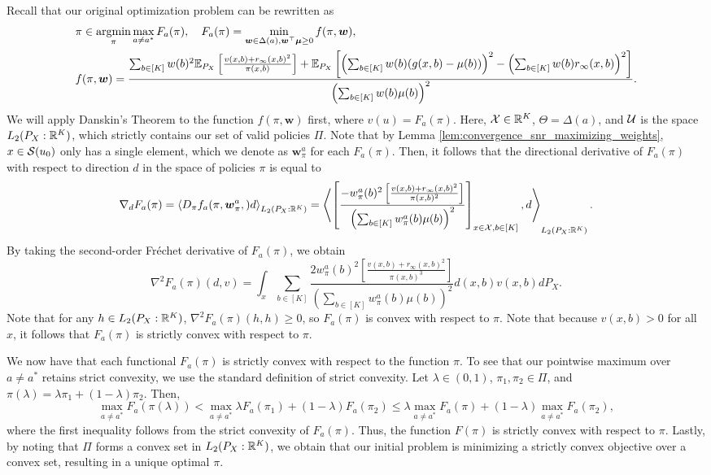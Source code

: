 \documentclass{article}
\begin{document}
\begin{appendices}
Recall that our original optimization problem can be rewritten as 
\begin{align}
    &\pi \in \argmin_{\pi} \max_{a \neq a^*} F_a(\pi), \quad F_a(\pi) = \min_{\bm{w} \in \Delta(a), \bm{w}^\top \bm{\mu} \geq 0} f(\pi, \bm{w}), \\
    &f(\pi, \bm{w}) = \frac{\sum_{b \in [K]} w(b)^2\EE_{P_X}\left[\frac{v(x,b) + r_\infty(x,b)^2}{\pi(x,b)}\right]+ \EE_{P_X}\left[ \left(\sum_{b \in [K]} w(b) (g(x,b)- \mu(b)) \right)^2 - \left(\sum_{b \in [K]} w(b) r_\infty(x,b) \right)^2 \right] }{\left(\sum_{b \in [K]} w(b)  \mu(b) \right)^2}.
\end{align}
We will apply Danskin's Theorem to the function $f(\pi, \bm{w})$ first, where $v(u) = F_a(\pi)$. Here, $\mathcal{X} \in \mathbb{R}^K$, $\Theta = \Delta(a)$, and $\mathcal{U} $ is the space $L_2(P_X: \mathbb{R}^K)$, which strictly contains our set of valid policies $\Pi$. Note that by Lemma \ref{lem:convergence_snr_maximizing_weights}, $x \in \mathcal{S}(u_0)$ only has a single element, which we denote as $\bm{w}^a_\pi$ for each $F_a(\pi)$. Then, it follows that the directional derivative of $F_a(\pi)$ with respect to direction $d$ in the space of policies $\pi$ is equal to 
\begin{equation}
    \nabla_{d} F_a(\pi) = \left\langle D_{\pi}f_a(\pi, \boldsymbol{w}_\pi^a,) d \right\rangle_{L_2(P_X:\mathbb{R}^K)} = \left\langle\left[\frac{-w_\pi^a(b)^2 \left[\frac{v(x,b) + r_\infty(x,b)^2}{\pi(x,b)^2} \right] }{\left(\sum_{b \in [K]} w_\pi^a(b)\mu(b) \right)^2} \right]_{x \in \mathcal{X}, b \in [K]}, d \right\rangle_{L_2(P_X:\mathbb{R}^K)}.
\end{equation}
By taking the second-order Fréchet derivative of $F_a(\pi)$, we obtain
\begin{equation}
    \nabla^2 F_a(\pi)(d, v) = \int_x \sum_{b \in [K]}\frac{2w_\pi^a(b)^2\left[\frac{v(x,b) + r_\infty(x,b)^2}{\pi(x,b)^3}\right] }{\left(\sum_{b \in [K]} w_\pi^a(b) \mu(b) \right)^2} d(x,b) v(x,b) dP_X. 
\end{equation}
Note that for any $h \in L_2(P_X: \mathbb{R}^K)$, $\nabla^2 F_a(\pi)(h,h) \geq 0$, so $F_a(\pi)$ is convex with respect to $\pi$. Note that because $v(x,b) > 0$ for all $x$, it follows that $F_a(\pi)$ is strictly convex with respect to $\pi$. 

We now have that each functional $F_a(\pi)$ is strictly convex with respect to the function $\pi$. To see that our pointwise maximum over $a \neq a^*$ retains strict convexity, we use the standard definition of strict convexity. Let $\lambda \in (0,1)$, $\pi_1, \pi_2 \in \Pi$, and $\pi(\lambda) = \lambda\pi_1 + (1-\lambda)\pi_2$. Then, 
    \begin{equation}
        \max_{a \neq a^*} F_a(\pi(\lambda))  < \max_{a \neq a^*} \lambda F_a(\pi_1) + (1-\lambda)F_a(\pi_2) \leq \lambda \max_{a \neq a^*} F_a(\pi) + (1-\lambda) \max_{a \neq a^*} F_a(\pi_2),
    \end{equation}
    where the first inequality follows from the strict convexity of $F_a(\pi)$. Thus, the function $F(\pi)$ is strictly convex with respect to $\pi$. Lastly, by noting that $\Pi$ forms a convex set in $L_2(P_X: \mathbb{R}^K)$, we obtain that our initial problem is minimizing a strictly convex objective over a convex set, resulting in a unique optimal $\pi$. 



\end{appendices}
\end{document}
